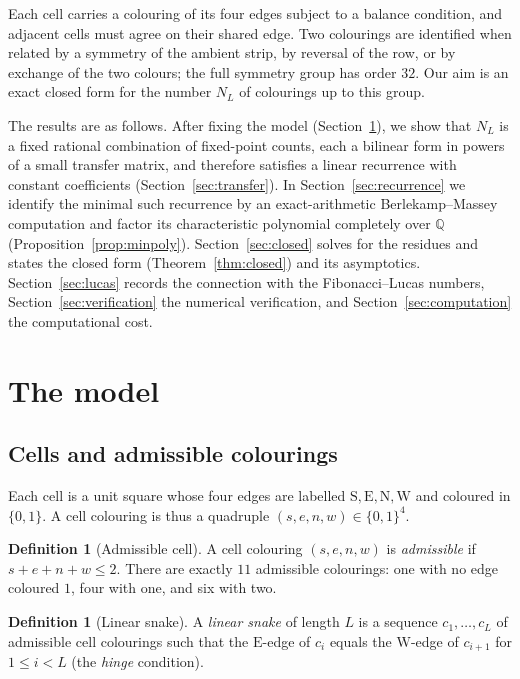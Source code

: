 \documentclass[11pt,a4paper]{article}
\theoremstyle{plain}
\theoremstyle{definition}
\newtheorem{definition}[theorem]{Definition}
\theoremstyle{remark}
\newcommand{\Q}{\mathbb{Q}}
\numberwithin{equation}{section}
\begin{document}
Each cell carries a colouring of its four edges subject to a balance
condition, and adjacent cells must agree on their shared edge. Two
colourings are identified when related by a symmetry of the ambient strip,
by reversal of the row, or by exchange of the two colours; the full
symmetry group has order $32$. Our aim is an exact closed form for the
number $N_L$ of colourings up to this group.

The results are as follows. After fixing the model
(Section~\ref{sec:model}), we show that $N_L$ is a fixed rational
combination of fixed-point counts, each a bilinear form in powers of a
small transfer matrix, and therefore satisfies a linear recurrence with
constant coefficients (Section~\ref{sec:transfer}). In
Section~\ref{sec:recurrence} we identify the minimal such recurrence by an
exact-arithmetic Berlekamp--Massey computation and factor its
characteristic polynomial completely over $\Q$
(Proposition~\ref{prop:minpoly}). Section~\ref{sec:closed} solves for the
residues and states the closed form (Theorem~\ref{thm:closed}) and its
asymptotics. Section~\ref{sec:lucas} records the connection with the
Fibonacci--Lucas numbers, Section~\ref{sec:verification} the numerical
verification, and Section~\ref{sec:computation} the computational cost.

\section{The model}\label{sec:model}

\subsection{Cells and admissible colourings}

Each cell is a unit square whose four edges are labelled
$\mathrm S,\mathrm E,\mathrm N,\mathrm W$ and coloured in $\{0,1\}$. A
cell colouring is thus a quadruple $(s,e,n,w)\in\{0,1\}^{4}$.

\begin{definition}[Admissible cell]\label{def:cell}
A cell colouring $(s,e,n,w)$ is \emph{admissible} if $s+e+n+w\le 2$. There
are exactly $11$ admissible colourings: one with no edge coloured $1$,
four with one, and six with two.
\end{definition}

\begin{definition}[Linear snake]\label{def:snake}
A \emph{linear snake} of length $L$ is a sequence $c_1,\dots,c_L$ of
admissible cell colourings such that the $\mathrm E$-edge of $c_i$ equals
the $\mathrm W$-edge of $c_{i+1}$ for $1\le i<L$ (the \emph{hinge}
condition).
\end{definition}
\end{document}
